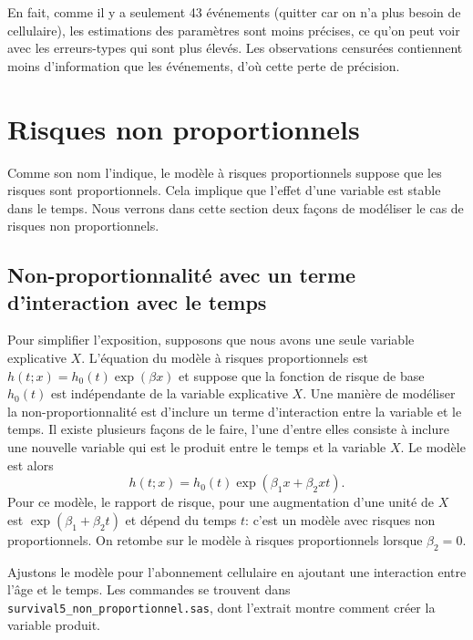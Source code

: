 \documentclass[
  11pt,
  letterpaper,
]{book}
\theoremstyle{definition}
\theoremstyle{definition}
\theoremstyle{definition}
\theoremstyle{definition}
\theoremstyle{remark}
\begin{document}
En fait, comme il y a seulement 43 événements (quitter car on n'a plus besoin de cellulaire), les estimations des paramètres sont moins précises, ce qu'on peut voir avec les erreurs-types qui sont plus élevés. Les observations censurées contiennent moins d'information que les événements, d'où cette perte de précision.

\hypertarget{risques-non-proportionnels}{%
\section{Risques non proportionnels}\label{risques-non-proportionnels}}

Comme son nom l'indique, le modèle à risques proportionnels suppose que les risques sont proportionnels. Cela implique que l'effet d'une variable est stable dans le temps. Nous verrons dans cette section deux façons de modéliser le cas de risques non proportionnels.

\hypertarget{non-proportionnalituxe9-avec-un-terme-dinteraction-avec-le-temps}{%
\subsection{Non-proportionnalité avec un terme d'interaction avec le temps}\label{non-proportionnalituxe9-avec-un-terme-dinteraction-avec-le-temps}}

Pour simplifier l'exposition, supposons que nous avons une seule variable explicative \(X\). L'équation du modèle à risques proportionnels est \(h(t; x) = h_0(t)\exp(\beta x)\) et suppose que la fonction de risque de base \(h_0(t)\) est indépendante de la variable explicative \(X\). Une manière de modéliser la non-proportionnalité est d'inclure un terme d'interaction entre la variable et le temps. Il existe plusieurs façons de le faire, l'une d'entre elles consiste à inclure une nouvelle variable qui est le produit entre le temps et la variable \(X\). Le modèle est alors \[h(t; x) = h_0(t) \exp(\beta_1x + \beta_2xt).\]
Pour ce modèle, le rapport de risque, pour une augmentation d'une unité de \(X\) est \(\exp(\beta_1+ \beta_2t)\) et dépend du temps \(t\): c'est un modèle avec risques non proportionnels. On retombe sur le modèle à risques proportionnels lorsque \(\beta_2=0\).

Ajustons le modèle pour l'abonnement cellulaire en ajoutant une interaction entre l'âge et le temps. Les commandes se trouvent dans \texttt{survival5\_non\_proportionnel.sas}, dont l'extrait montre comment créer la variable produit.
\end{document}
